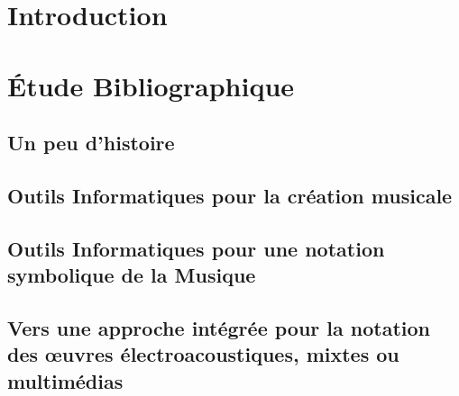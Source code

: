 \documentclass[a4paper, oneside]{book}
\theoremstyle{definition}
\begin{document}



\setcounter{tocdepth}{1} %

\tableofcontents
\clearpage

\chapter{Introduction}



\chapter{Étude Bibliographique}

\section{Un peu d'histoire}
\label{sec:unPeuDHistoire}


\section{Outils Informatiques pour la création musicale}
\label{sec:outilsInfosProdMus}
	

\section{Outils Informatiques pour une notation symbolique de la Musique}
\label{sec:outilsNotationSymbolique}

	
\section[Notation des œuvres électroacoustiques, mixtes ou multimédias]{Vers une approche intégrée pour la notation des œuvres électroacoustiques, mixtes ou multimédias}
\label{sec:outilsNotationElectroMixteMulti}

	
\end{document}
